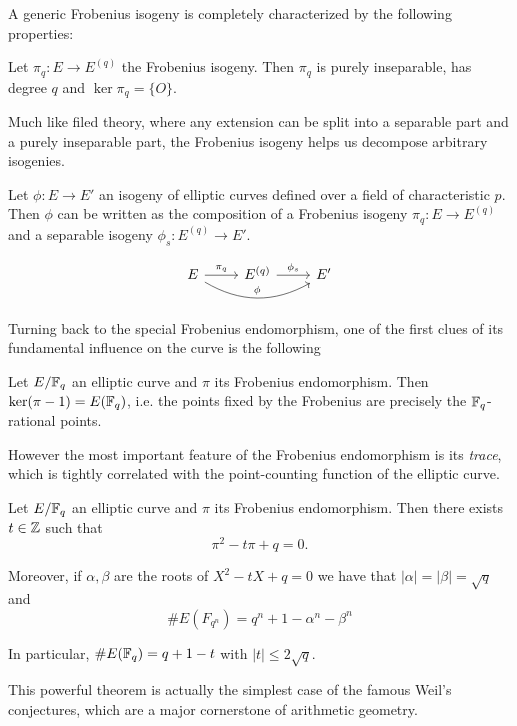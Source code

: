 A generic Frobenius isogeny is completely characterized by the following properties:
\begin{proposition}
    Let $\pi_q:E\to E^{(q)}$ the Frobenius isogeny. Then $\pi_q$ is purely inseparable, has degree $q$ and $\ker\pi_q = \{O\}$.
\end{proposition}

Much like filed theory, where any extension can be split into a separable part and a purely inseparable part, the Frobenius isogeny helps us decompose arbitrary isogenies.
\begin{proposition}
    Let $\phi: E\to E'$ an isogeny of elliptic curves defined over a field of characteristic $p$. Then $\phi$ can be written as the composition of a Frobenius isogeny $\pi_q:E\to E^{(q)}$ and a separable isogeny $\phi_s:E^{(q)}\to E'$.
    
    \[\begin{tikzcd}
        E\rar["\pi_q"] \ar[rr, bend right, "\phi"] & E^{(q)} \rar["\phi_s"] & E'
    \end{tikzcd}\]
\end{proposition}


Turning back to the special Frobenius endomorphism, one of the first clues of its fundamental influence on the curve is the following
\begin{proposition}
    Let $E/\mathbb{F}_q$ an elliptic curve and $\pi$ its Frobenius endomorphism. Then $\ker(\pi-1) = E(\mathbb{F}_q)$, i.e. the points fixed by the Frobenius are precisely the $\mathbb{F}_q$-rational points.
\end{proposition}



However the most important feature of the Frobenius endomorphism is its \emph{trace}, which is tightly correlated with the point-counting function of the elliptic curve.

\begin{theorem}
    Let $E/\mathbb{F}_q$ an elliptic curve and $\pi$ its Frobenius endomorphism. Then there exists $t\in\mathbb{Z}$ such that $$\pi^2-t\pi+q=0.$$
    
    Moreover, if $\alpha,\beta$ are the roots of $X^2-tX+q=0$ we have that $|\alpha|=|\beta|=\sqrt q$ and $$\# E(F_{q^n}) = q^n+1-\alpha^n-\beta^n$$
    
    In particular, $\# E(\mathbb{F}_q) = q+1-t$ with $|t|\le2\sqrt q$.
\end{theorem}

This powerful theorem is actually the simplest case of the famous Weil's conjectures, which are a major cornerstone of arithmetic geometry.


